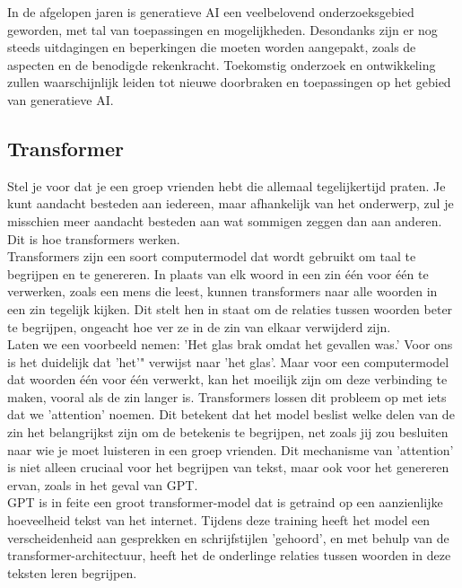 In de afgelopen jaren is generatieve AI een veelbelovend onderzoeksgebied geworden, met tal van toepassingen en mogelijkheden. Desondanks zijn er nog steeds uitdagingen en beperkingen die moeten worden aangepakt, zoals de  aspecten en de benodigde rekenkracht. Toekomstig onderzoek en ontwikkeling zullen waarschijnlijk leiden tot nieuwe doorbraken en toepassingen op het gebied van generatieve AI. \\

\subsection{Transformer}
Stel je voor dat je een groep vrienden hebt die allemaal tegelijkertijd praten. Je kunt aandacht besteden aan iedereen, maar afhankelijk van het onderwerp, zul je misschien meer aandacht besteden aan wat sommigen zeggen dan aan anderen. Dit is hoe transformers werken. \\

Transformers zijn een soort computermodel dat wordt gebruikt om taal te begrijpen en te genereren. In plaats van elk woord in een zin één voor één te verwerken, zoals een mens die leest, kunnen transformers naar alle woorden in een zin tegelijk kijken. Dit stelt hen in staat om de relaties tussen woorden beter te begrijpen, ongeacht hoe ver ze in de zin van elkaar verwijderd zijn. \\

Laten we een voorbeeld nemen: 'Het glas brak omdat het gevallen was.' Voor ons is het duidelijk dat 'het'" verwijst naar 'het glas'. Maar voor een computermodel dat woorden één voor één verwerkt, kan het moeilijk zijn om deze verbinding te maken, vooral als de zin langer is. Transformers lossen dit probleem op met iets dat we 'attention' noemen. Dit betekent dat het model beslist welke delen van de zin het belangrijkst zijn om de betekenis te begrijpen, net zoals jij zou besluiten naar wie je moet luisteren in een groep vrienden. Dit mechanisme van 'attention' is niet alleen cruciaal voor het begrijpen van tekst, maar ook voor het genereren ervan, zoals in het geval van GPT. \\

GPT is in feite een groot transformer-model dat is getraind op een aanzienlijke hoeveelheid tekst van het internet. Tijdens deze training heeft het model een verscheidenheid aan gesprekken en schrijfstijlen 'gehoord', en met behulp van de transformer-architectuur, heeft het de onderlinge relaties tussen woorden in deze teksten leren begrijpen. 


